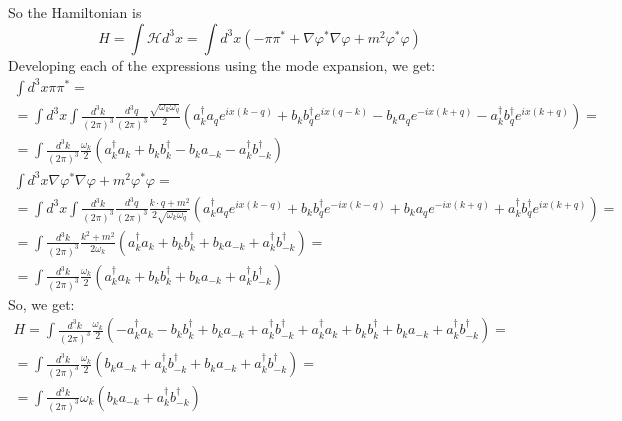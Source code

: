 \documentclass{article}
\begin{document}
So the Hamiltonian is
\begin{equation}
    H = \int \mathcal{H} d^3x = \int d^3x \left(
        -\pi\pi^* + \nabla \varphi^* \nabla\varphi + m^2\varphi^*\varphi
    \right)
\end{equation}
Developing each of the expressions using the mode expansion, we get:
\begin{equation}
\begin{gathered}
    \int d^3x \pi\pi^* = \\ = \int d^3x \int \frac{d^3k}{(2\pi)^3} \frac{d^3q}{(2\pi)^3}\frac{\sqrt{\omega_k \omega_q}}{2}\left(
        a_k^\dagger a_q e^{ix(k-q)} + b_k b_q^\dagger e^{ix(q-k)}
        - b_k a_q e^{-ix(k+q)} - a_k^\dagger b_q^\dagger e^{ix(k+q)} 
    \right) = \\ =
    \int \frac{d^3k}{(2\pi)^3}\frac{\omega_k}{2}\left(
        a_k^\dagger a_k + b_k b_k^\dagger
        - b_k a_{-k} - a_k^\dagger b_{-k}^\dagger 
    \right)
\end{gathered}
\end{equation}
\begin{equation}
\begin{gathered}
    \int d^3x \nabla \varphi^* \nabla \varphi + m^2 \varphi^* \varphi = \\ = 
    \int d^3 x  \int \frac{d^3k}{(2\pi)^3} \frac{d^3q}{(2\pi)^3}
    \frac{k \cdot q + m^2}{2\sqrt{\omega_k \omega_q}}
    \left(
        a_k^\dagger a_q e^{ix(k-q)} + b_k b_q^\dagger e^{-ix(k-q)} +
        b_k a_q e^{-ix(k+q)} + a_k^\dagger b_q^\dagger e^{ix(k+q)}
    \right) = \\ =
    \int \frac{d^3k}{(2\pi)^3} \frac{k^2 + m^2}{2\omega_k} \left(
        a_k^\dagger a_k + b_k b_k^\dagger + b_k a_{-k} + a_k^\dagger b_{-k}^\dagger
    \right) = \\ =
    \int \frac{d^3k}{(2\pi)^3} \frac{\omega_k}{2} \left(
        a_k^\dagger a_k + b_k b_k^\dagger + b_k a_{-k} + a_k^\dagger b_{-k}^\dagger
    \right)
\end{gathered}
\end{equation}
So, we get:
\begin{equation}
\begin{gathered}
    H = \int \frac{d^3k}{(2\pi)^3} \frac{\omega_k}{2} \left(
        - a_k^\dagger a_k - b_k b_k^\dagger + b_k a_{-k} + a_k^\dagger b_{-k}^\dagger 
        + a_k^\dagger a_k + b_k b_k^\dagger + b_k a_{-k} + a_k^\dagger b_{-k}^\dagger
    \right) = \\ =
    \int \frac{d^3k}{(2\pi)^3} \frac{\omega_k}{2} \left(
        b_k a_{-k} + a_k^\dagger b_{-k}^\dagger +
        b_k a_{-k} + a_k^\dagger b_{-k}^\dagger
    \right) = \\ =
    \int \frac{d^3k}{(2\pi)^3} \omega_k\left(
        b_k a_{-k} + a_k^\dagger b_{-k}^\dagger
    \right)
\end{gathered}
\end{equation}
\end{document}
